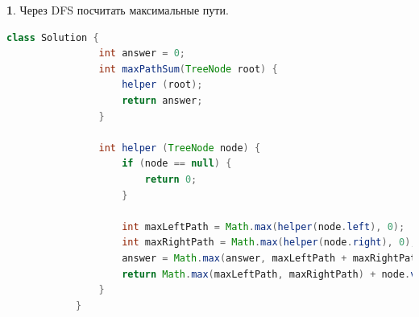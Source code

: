 \documentclass[14pt, a4paper]{extarticle}
\theoremstyle{definition}
\newtheorem{problem}{}
\theoremstyle{definition}
\theoremstyle{remark}
\numberwithin{equation}{section}
\begin{document}
\begin{problem}
    Через DFS посчитать максимальные пути.
    \begin{footnotesize}
        \begin{lstlisting}[language=Java]
            class Solution {
                int answer = 0;
                int maxPathSum(TreeNode root) {
                    helper (root);
                    return answer;
                }

                int helper (TreeNode node) {
                    if (node == null) {
                        return 0;
                    }
                
                    int maxLeftPath = Math.max(helper(node.left), 0);
                    int maxRightPath = Math.max(helper(node.right), 0);
                    answer = Math.max(answer, maxLeftPath + maxRightPath + node.val);
                    return Math.max(maxLeftPath, maxRightPath) + node.val;
                }
            }
        \end{lstlisting}
    \end{footnotesize}
\end{problem}
\end{document}
